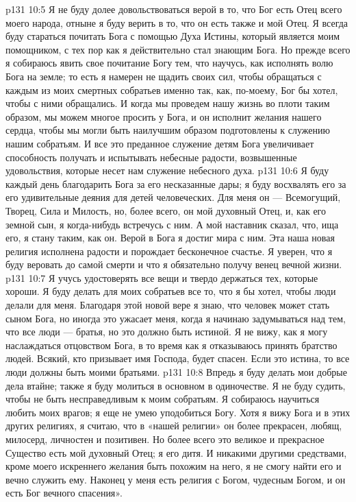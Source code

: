 \vs p131 10:5 Я не буду долее довольствоваться верой в то, что Бог есть Отец всего моего народа, отныне я буду верить в то, что он есть также и мой Отец. Я всегда буду стараться почитать Бога с помощью Духа Истины, который является моим помощником, с тех пор как я действительно стал знающим Бога. Но прежде всего я собираюсь явить свое почитание Богу тем, что научусь, как исполнять волю Бога на земле; то есть я намерен не щадить своих сил, чтобы обращаться с каждым из моих смертных собратьев именно так, как, по\hyp{}моему, Бог бы хотел, чтобы с ними обращались. И когда мы проведем нашу жизнь во плоти таким образом, мы можем многое просить у Бога, и он исполнит желания нашего сердца, чтобы мы могли быть наилучшим образом подготовлены к служению нашим собратьям. И все это преданное служение детям Бога увеличивает способность получать и испытывать небесные радости, возвышенные удовольствия, которые несет нам служение небесного духа.
\vs p131 10:6 Я буду каждый день благодарить Бога за его несказанные дары; я буду восхвалять его за его удивительные деяния для детей человеческих. Для меня он --- Всемогущий, Творец, Сила и Милость, но, более всего, он мой духовный Отец, и, как его земной сын, я когда\hyp{}нибудь встречусь с ним. А мой наставник сказал, что, ища его, я стану таким, как он. Верой в Бога я достиг мира с ним. Эта наша новая религия исполнена радости и порождает бесконечное счастье. Я уверен, что я буду веровать до самой смерти и что я обязательно получу венец вечной жизни.
\vs p131 10:7 Я учусь удостоверять все вещи и твердо держаться тех, которые хороши. Я буду делать для моих собратьев все то, что я бы хотел, чтобы люди делали для меня. Благодаря этой новой вере я знаю, что человек может стать сыном Бога, но иногда это ужасает меня, когда я начинаю задумываться над тем, что все люди --- братья, но это должно быть истиной. Я не вижу, как я могу наслаждаться отцовством Бога, в то время как я отказываюсь принять братство людей. Всякий, кто призывает имя Господа, будет спасен. Если это истина, то все люди должны быть моими братьями.
\vs p131 10:8 Впредь я буду делать мои добрые дела втайне; также я буду молиться в основном в одиночестве. Я не буду судить, чтобы не быть несправедливым к моим собратьям. Я собираюсь научиться любить моих врагов; я еще не умею уподобиться Богу. Хотя я вижу Бога и в этих других религиях, я считаю, что в «нашей религии» он более прекрасен, любящ, милосерд, личностен и позитивен. Но более всего это великое и прекрасное Существо есть мой духовный Отец; я его дитя. И никакими другими средствами, кроме моего искреннего желания быть похожим на него, я не смогу найти его и вечно служить ему. Наконец у меня есть религия с Богом, чудесным Богом, и он есть Бог вечного спасения».
